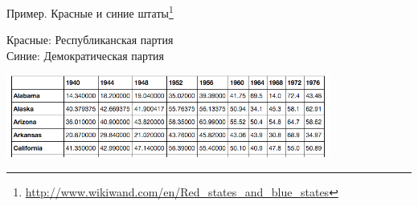 \documentclass[aspectratio=169]{beamer}
\begin{document}
\begin{frame}{Пример. Красные и синие штаты\footnote{\url{http://www.wikiwand.com/en/Red_states_and_blue_states}}}

{\color{red} Красные}: Республиканская партия \\
{\color{blue} Синие}: Демократическая партия

\begin{center}
\includegraphics[width=0.8\textwidth]{images/votes.png}
\end{center}

\end{frame}
\end{document}

